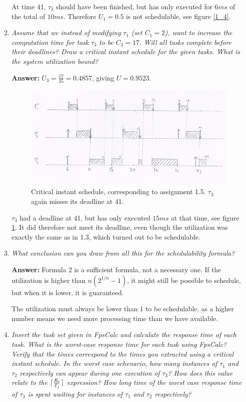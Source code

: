\documentclass[a4paper,10pt]{article}
\DeclarePairedDelimiter{\ceil}{\lceil}{\rceil}
\newcommand{\answer}{\textbf{Answer: }}
\begin{document}
\begin{enumerate}
	At time 41, $\tau_3$ should have been finished, but has only executed for $6 ms$ of the total of $10 ms$. Therefore $U_1 = 0.5$ is not schedulable, see figure \ref{1_4}.
	
	\item \emph{Assume that we instead of modifying $\tau_1$ (set $C_1 = 2$), want to increase the computation time for task $\tau_3$ to be $C_3 = 17$. Will all tasks complete before their deadlines? Draw a critical instant schedule for the given tasks. What is the system utilization bound?}
	
	\answer $U_3 = \frac{17}{35} = 0.4857$, giving $U = 0.9523$.
	
	\begin{figure}
	\includegraphics[scale=0.4]{1_5_low}
	\caption{Critical instant schedule, corresponding to assignment 1.5. $\tau_3$ again misses its deadline at 41.}
	\label{1_5}
	\end{figure}
	
	$\tau_3$ had a deadline at 41, but has only executed $15 ms$ at that time, see figure \ref{1_5}. It did therefore not meet its deadline, even though the utilization was exactly the same as in 1.3, which turned out to be schedulable.
	
	\item \emph{What conclusion can you draw from all this for the schedulability formula?}
	
	\answer Formula 2 is a sufficient formula, not a necessary one. If the utilization is higher than $n(2^{1/n}-1)$, it might still be possible to schedule, but when it is lower, it is guaranteed.
	
	The utilization must always be lower than 1 to be schedulable, as a higher number means we need more processing time than we have available.
	
	\item \emph{Insert the task set given in FpsCalc and calculate the response time of each task. What is the worst-case response time for each task using FpsCalc? Verify that the times correspond to the times you extracted using a critical instant schedule. In the worst case schenario, how many instances of $\tau_1$ and $\tau_2$ respectively can appear during one execution of $\tau_3$? How does this value relate to the $\ceil{\frac{R_i}{T_j}}$ expression? How long time of the worst case response time of $\tau_3$ is spent waiting for instances of $\tau_1$ and $\tau_2$ respectively?}
	

\end{enumerate}
\end{document}
